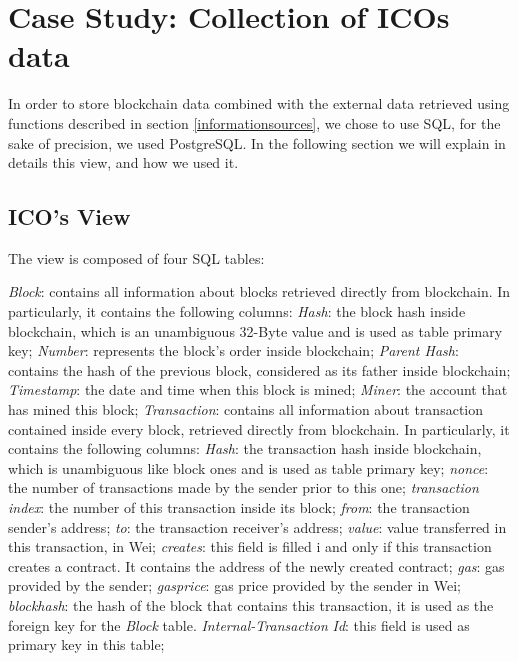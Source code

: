 \section{Case Study: Collection of ICOs data}
In order to store blockchain data combined with the external data retrieved using functions described in section \ref{informationsources}, we chose to use SQL, for the sake of precision, we used PostgreSQL.
In the following section we will explain in details this view, and how we used it.
\subsection{ICO's View}
The view is composed of four SQL tables: 
\begin{outline}
    \1 \textit{Block}: contains all information about blocks retrieved directly from blockchain. In particularly, it contains the following columns:
        \2 \textit{Hash}: the block hash inside blockchain, which is an unambiguous 32-Byte value and is used as table primary key;
        \2 \textit{Number}: represents the block's order inside blockchain;
        \2 \textit{Parent Hash}: contains the hash of the previous block, considered as its father inside blockchain;
        \2 \textit{Timestamp}: the date and time when this block is mined;
        \2 \textit{Miner}: the account that has mined this block;
    \1 \textit{Transaction}: contains all information about transaction contained inside every block, retrieved directly from blockchain. In particularly, it contains the following columns:
        \2 \textit{Hash}: the transaction hash inside blockchain, which is unambiguous like block ones and is used as table primary key;
        \2 \textit{nonce}: the number of transactions made by the sender prior to this one;
        \2 \textit{transaction index}: the number of this transaction inside its block;
        \2 \textit{from}: the transaction sender's address;
        \2 \textit{to}: the transaction receiver's address;
        \2 \textit{value}: value transferred in this transaction, in Wei;
        \2 \textit{creates}: this field is filled i and only if this transaction creates a contract. It contains the address of the newly created contract;
        \2 \textit{gas}: gas provided by the sender;
        \2 \textit{gasprice}: gas price provided by the sender in Wei;
        \2 \textit{blockhash}: the hash of the block that contains this transaction, it is used as the foreign key for the \textit{Block} table.
    \1 \textit{Internal-Transaction}
        \2 \textit{Id}: this field is used as primary key in this table;

\end{outline}
